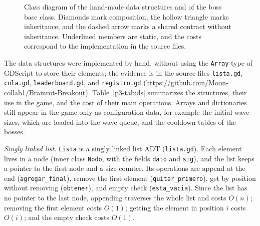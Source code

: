 \documentclass[conference]{IEEEtran}
\begin{document}
\begin{figure}[t]
{}
\caption{Class diagram of the hand-made data structures and of the boss base class. Diamonds mark composition, the hollow triangle marks inheritance, and the dashed arrow marks a shared contract without inheritance. Underlined members are static, and the costs correspond to the implementation in the source files.}
\label{p3-fig:classes}
\end{figure}

The data structures were implemented by hand, without using the \texttt{Array} type of GDScript to store their elements; the evidence is in the source files \texttt{lista.gd}, \texttt{cola.gd}, \texttt{leaderboard.gd}, and \texttt{registro.gd} (\url{https://github.com/Moon-collab1/Brainrot-Breakout}). Table~\ref{p3-tab:ds} summarizes the structures, their use in the game, and the cost of their main operations. Arrays and dictionaries still appear in the game only as configuration data, for example the initial wave sizes, which are loaded into the wave queue, and the cooldown tables of the bosses.

\textit{Singly linked list.} \texttt{Lista} is a singly linked list ADT (\texttt{lista.gd}). Each element lives in a node (inner class \texttt{Nodo}, with the fields \texttt{dato} and \texttt{sig}), and the list keeps a pointer to the first node and a size counter. Its operations are append at the end (\texttt{agregar\_final}), remove the first element (\texttt{quitar\_primero}), get by position without removing (\texttt{obtener}), and empty check (\texttt{esta\_vacia}). Since the list has no pointer to the last node, appending traverses the whole list and costs $O(n)$; removing the first element costs $O(1)$; getting the element in position $i$ costs $O(i)$; and the empty check costs $O(1)$.
\end{document}
